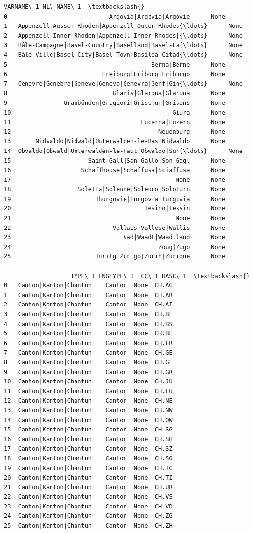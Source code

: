 \documentclass[11pt]{article}
\begin{document}
\begin{tcolorbox}[breakable, size=fbox, boxrule=.5pt, pad at break*=1mm, opacityfill=0]
\begin{Verbatim}[commandchars=\\\{\}]
                                            VARNAME\_1 NL\_NAME\_1  \textbackslash{}
0                             Argovia|Arg¢via|Argovie      None
1   Appenzell Ausser-Rhoden|Appenzell Outer Rhodes{\ldots}      None
2   Appenzell Inner-Rhoden|Appenzell Inner Rhodes|{\ldots}      None
3   Bâle-Campagne|Basel-Country|Baselland|Basel-La{\ldots}      None
4   Bâle-Ville|Basel-City|Basel-Town|Basilea-Citad{\ldots}      None
5                                         Berna|Berne      None
6                           Freiburg|Friburg|Friburgo      None
7   Cenevre|Genebra|Geneve|Geneva|Genevra|Genf|Gin{\ldots}      None
8                              Glaris|Glarona|Glaruna      None
9                Graubünden|Grigioni|Grischun|Grisons      None
10                                              Giura      None
11                                     Lucerna|Luzern      None
12                                          Neuenburg      None
13       Nidvaldo|Nidwald|Unterwalden-le-Bas|Nidwaldo      None
14  Obvaldo|Obwald|Unterwalden-le-Haut|Obwaldo|Sur{\ldots}      None
15                      Saint-Gall|San Gallo|Son Gagl      None
16                    Schaffhouse|Schaffusa|Sciaffusa      None
17                                               None      None
18                   Soletta|Soleure|Soleuro|Soloturn      None
19                        Thurgovie|Turgovia|Turg¢via      None
20                                      Tesino|Tessin      None
21                                               None      None
22                             Vallais|Vallese|Wallis      None
23                                Vad|Waadt|Waadtland      None
24                                          Zoug|Zugo      None
25                        Turitg|Zurigo|Zürih|Zurique      None

                   TYPE\_1 ENGTYPE\_1  CC\_1 HASC\_1  \textbackslash{}
0   Canton|Kanton|Chantun    Canton  None  CH.AG
1   Canton|Kanton|Chantun    Canton  None  CH.AR
2   Canton|Kanton|Chantun    Canton  None  CH.AI
3   Canton|Kanton|Chantun    Canton  None  CH.BL
4   Canton|Kanton|Chantun    Canton  None  CH.BS
5   Canton|Kanton|Chantun    Canton  None  CH.BE
6   Canton|Kanton|Chantun    Canton  None  CH.FR
7   Canton|Kanton|Chantun    Canton  None  CH.GE
8   Canton|Kanton|Chantun    Canton  None  CH.GL
9   Canton|Kanton|Chantun    Canton  None  CH.GR
10  Canton|Kanton|Chantun    Canton  None  CH.JU
11  Canton|Kanton|Chantun    Canton  None  CH.LU
12  Canton|Kanton|Chantun    Canton  None  CH.NE
13  Canton|Kanton|Chantun    Canton  None  CH.NW
14  Canton|Kanton|Chantun    Canton  None  CH.OW
15  Canton|Kanton|Chantun    Canton  None  CH.SG
16  Canton|Kanton|Chantun    Canton  None  CH.SH
17  Canton|Kanton|Chantun    Canton  None  CH.SZ
18  Canton|Kanton|Chantun    Canton  None  CH.SO
19  Canton|Kanton|Chantun    Canton  None  CH.TG
20  Canton|Kanton|Chantun    Canton  None  CH.TI
21  Canton|Kanton|Chantun    Canton  None  CH.UR
22  Canton|Kanton|Chantun    Canton  None  CH.VS
23  Canton|Kanton|Chantun    Canton  None  CH.VD
24  Canton|Kanton|Chantun    Canton  None  CH.ZG
25  Canton|Kanton|Chantun    Canton  None  CH.ZH


\end{Verbatim}
\end{tcolorbox}
\end{document}

